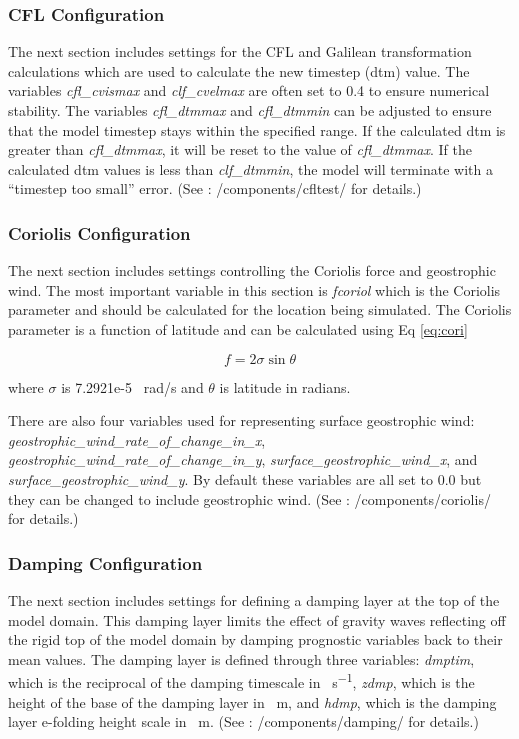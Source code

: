 \subsubsection{CFL Configuration}
The next section includes settings for the CFL and Galilean transformation calculations which are used to calculate the new timestep (dtm) value. The variables \textit{cfl\_cvismax} and \textit{clf\_cvelmax} are often set to 0.4 to ensure numerical stability. The variables \textit{cfl\_dtmmax} and \textit{cfl\_dtmmin} can be adjusted to ensure that the model timestep stays within the specified range. If the calculated dtm is greater than \textit{cfl\_dtmmax}, it will be reset to the value of \textit{cfl\_dtmmax}. If the calculated dtm values is less than \textit{clf\_dtmmin}, the model will terminate with a ``timestep too small'' error. (See \cite{moncCode}: /components/cfltest/ for details.)

\subsubsection{Coriolis Configuration}
The next section includes settings controlling the Coriolis force and geostrophic wind. The most important variable in this section is \textit{fcoriol} which is the Coriolis parameter and should be calculated for the location being simulated. The Coriolis parameter is a function of latitude and can be calculated using Eq \ref{eq:cori}

\begin{equation} \label{eq:cori}
f = 2 \sigma \sin \theta
\end{equation}

where $\sigma$ is 7.2921e-5 \SI{}{rad/s} and $\theta$ is latitude in radians. \citep{fcoriol}

There are also four variables used for representing surface geostrophic wind: \textit{geostrophic\_wind\_rate\_of\_change\_in\_x}, \textit{geostrophic\_wind\_rate\_of\_change\_in\_y}, \textit{surface\_geostrophic\_wind\_x}, and \textit{surface\_geostrophic\_wind\_y}. By default these variables are all set to 0.0 but they can be changed to include geostrophic wind. (See \cite{moncCode}: /components/coriolis/ for details.)

\subsubsection{Damping Configuration}
The next section includes settings for defining a damping layer at the top of the model domain. This damping layer limits the effect of gravity waves reflecting off the rigid top of the model domain by damping prognostic variables back to their mean values. The damping layer is defined through three variables: \textit{dmptim}, which is the reciprocal of the damping timescale in \SI{}{s^{-1}}, \textit{zdmp}, which is the height of the base of the damping layer in \SI{}{m}, and \textit{hdmp}, which is the damping layer e-folding height scale in \SI{}{m}. (See \cite{moncCode}: /components/damping/ for details.)


